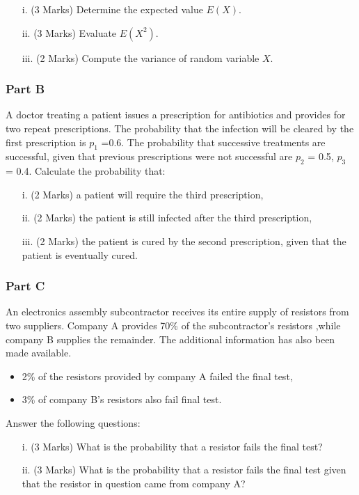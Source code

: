 \documentclass[a4paper,12pt]{article}
\begin{document}
\begin{itemize}
\item[i.] (3 Marks) Determine the expected value $E(X)$.
\item[ii.] (3 Marks) Evaluate $E(X^2)$.
\item[iii.] (2 Marks) Compute the variance of random variable $X$.
\end{itemize}

\subsubsection*{Part B} %
A doctor treating a patient issues a prescription for antibiotics and provides for two repeat prescriptions. The probability that the infection will be cleared by the first prescription is $p_1$ =0.6.
The probability that successive treatments are successful, given that previous prescriptions were not successful are $p_2$ = 0.5, $p_3$ = 0.4. Calculate the probability that:

\begin{itemize}
\item[i.](2 Marks) a patient will require the third prescription,
\item[ii.](2 Marks) the patient is still infected after the third prescription,
\item[iii.](2 Marks) the patient is cured by the second prescription, given that the patient is eventually cured.
\end{itemize}
\subsubsection*{Part C}
An electronics assembly subcontractor receives its entire supply of resistors from two suppliers. Company A provides 70\% of the subcontractor's resistors ,while company B supplies the remainder. The additional information has also been made available.
\begin{itemize}
\item 2\% of the resistors provided by company A failed the final test,
\item 3\% of company B's resistors also fail final test.
\end{itemize}
\noindent Answer the following questions:
\begin{itemize}
\item[i.](3 Marks) What is the probability that a resistor fails the final test?
\item[ii.](3 Marks)  What is the probability that a resistor fails the final test given that the resistor in question came from company A?
\end{itemize}
\end{document}
